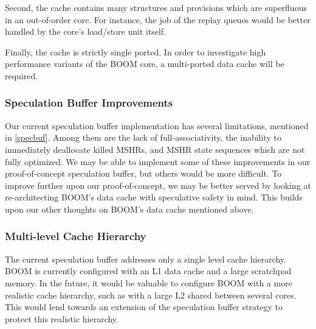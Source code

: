 Second, the cache contains many structures and provisions which are superfluous in an out-of-order core.
For instance, the job of the replay queues would be better handled by the core's load/store unit itself.

Finally, the cache is strictly single ported. In order to investigate high performance variants of the BOOM core,
a multi-ported data cache will be required.

\subsubsection{Speculation Buffer Improvements}
Our current speculation buffer implementation has several limitations, mentioned in \ref{specbuf}.
Among them are the lack of full-associativity, the inability to immediately deallocate killed MSHRs, and MSHR state sequences which are not fully optimized.
We may be able to implement some of these improvements in our proof-of-concept speculation buffer, but others would be more difficult. To improve further upon
our proof-of-concept, we may be better served by looking at re-architecting BOOM's data cache with speculative safety in mind. This builds upon our other thoughts
on BOOM's data cache mentioned above.

\subsubsection{Multi-level Cache Hierarchy}
The current speculation buffer addresses only a single level cache hierarchy.
BOOM is currently configured with an L1 data cache and a large scratchpad memory.
In the future, it would be valuable to configure BOOM with a more realistic cache hierarchy,
such as with a large L2 shared between several cores. This would lend towards an extension of the speculation
buffer strategy to protect this realistic hierarchy.

